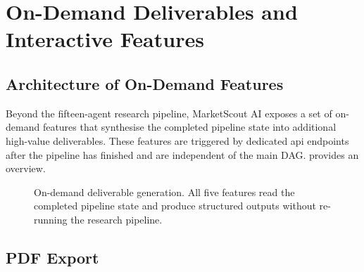 \documentclass[12pt,a4paper,oneside]{book}
\begin{document}
\chapter{On-Demand Deliverables and Interactive Features}
\label{chap:deliverables}

\section{Architecture of On-Demand Features}

Beyond the fifteen-agent research pipeline, MarketScout AI exposes a set of
on-demand features that synthesise the completed pipeline state into additional
high-value deliverables. These features are triggered by dedicated \gls{api}
endpoints after the pipeline has finished and are independent of the main DAG.
 provides an overview.

\begin{figure}[H]
\centering
{}
\caption{On-demand deliverable generation. All five features read the completed
pipeline state and produce structured outputs without re-running the research
pipeline.}
\label{fig:deliverables_arch}
\end{figure}

\section{PDF Export}
\label{sec:pdf_export}
\end{document}
